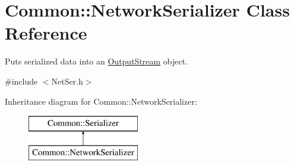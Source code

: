\hypertarget{class_common_1_1_network_serializer}{\section{Common\-:\-:Network\-Serializer Class Reference}
\label{class_common_1_1_network_serializer}
}


Puts serialized data into an \hyperlink{class_common_1_1_output_stream}{Output\-Stream} object.  




{\ttfamily \#include $<$Net\-Ser.\-h$>$}

Inheritance diagram for Common\-:\-:Network\-Serializer\-:\begin{figure}[H]
\begin{center}
\leavevmode
\includegraphics[height=2.000000cm]{class_common_1_1_network_serializer}
\end{center}
\end{figure}
